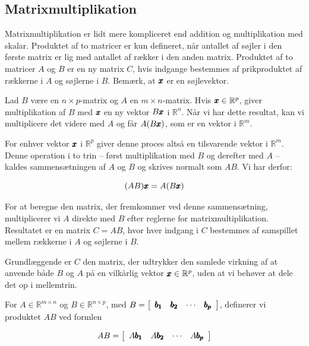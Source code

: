 \subsection*{Matrixmultiplikation}
Matrixmultiplikation er lidt mere kompliceret end addition og multiplikation med skalar. Produktet af to matricer er kun defineret, når antallet af søjler i den første matrix er lig med antallet af rækker i den anden matrix. Produktet af to matricer $A$ og $B$ er en ny matrix $C$, hvis indgange bestemmes af prikproduktet af rækkerne i $A$ og søjlerne i $B$. Bemærk, at $\pmb{x}$ er en søjlevektor.

Lad \(B\) være en \(n \times p\)-matrix og \(A\) en \(m \times n\)-matrix. Hvis \(\pmb{x} \in \mathbb{R}^p\), giver multiplikation af \(B\) med \(\pmb{x}\) en ny vektor \(B\pmb{x}\) i \(\mathbb{R}^n\). Når vi har dette resultat, kan vi multiplicere det videre med \(A\) og får \(A(B\pmb{x})\), som er en vektor i \(\mathbb{R}^m\).

For enhver vektor \(\pmb{x}\) i \(\mathbb{R}^p\) giver denne proces altså en tilsvarende vektor i \(\mathbb{R}^m\). Denne operation i to trin -- først multiplikation med \(B\) og derefter med \(A\) -- kaldes sammensætningen af \(A\) og \(B\) og skrives normalt som \(AB\). Vi har derfor:

\[
(AB)\pmb{x} = A(B\pmb{x})
\]

For at beregne den matrix, der fremkommer ved denne sammensætning, multiplicerer vi \(A\) direkte med \(B\) efter reglerne for matrixmultiplikation. Resultatet er en matrix \(C = AB\), hvor hver indgang i \(C\) bestemmes af samspillet mellem rækkerne i \(A\) og søjlerne i \(B\).

Grundlæggende er \(C\) den matrix, der udtrykker den samlede virkning af at anvende både \(B\) og \(A\) på en vilkårlig vektor \(\pmb{x} \in \mathbb{R}^p\), uden at vi behøver at dele det op i mellemtrin.

\begin{definition}
    For $A \in \mathbb{R}^{m \times n}$ og $B \in \mathbb{R}^{n \times p}$, med $B=\left[\begin{array}{llll}\pmb{b_1} & \pmb{b_2} & \cdots & \pmb{b_p}\end{array}\right]$, definerer vi produktet $A B$ ved formlen

\[
A B=\left[\begin{array}{llll}
A \pmb{b_1} & A \pmb{b_2} & \cdots & A \pmb{b_p}
\end{array}\right]
\]

\end{definition}

